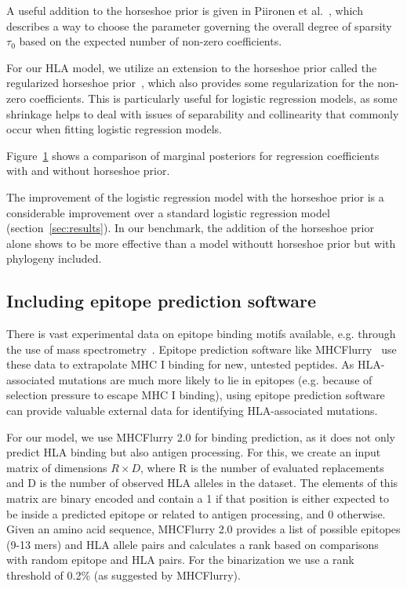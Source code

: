 \documentclass[fleqn,11pt]{SelfArx} %
\begin{document}
A useful addition to the horseshoe prior is given in Piironen et al.~\cite{Piironen2017}, which describes a way to choose the parameter governing the overall degree of sparsity \(\tau_{0}\) based on the expected number of non-zero coefficients. 

For our HLA model, we utilize an extension to the horseshoe prior called the regularized horseshoe prior~\cite{Piironen2017}, which also provides some regularization for the non-zero coefficients. This is particularly useful for logistic regression models, as some shrinkage helps to deal with issues of separability and collinearity that commonly occur when fitting logistic regression models.

Figure~\ref{fig:horseshoe-comparison} shows a comparison of marginal posteriors for regression coefficients with and without horseshoe prior.

The improvement of the logistic regression model with the horseshoe prior is a considerable improvement over a standard logistic regression model  (section~\ref{sec:results}). In our benchmark, the addition of the horseshoe prior alone shows to be more effective than a model withoutt horseshoe prior but with phylogeny included.

\begin{figure}
  \label{fig:horseshoe-comparison}
\end{figure}

\subsection*{Including epitope prediction software}

There is vast experimental data on epitope binding motifs available, e.g. through the use of mass spectrometry~\cite{Hunt1992}. Epitope prediction software like MHCFlurry~\cite{ODonnell2020} use these data to extrapolate MHC I binding for new, untested peptides.
As HLA-associated mutations are much more likely to lie in epitopes (e.g. because of selection pressure to escape MHC I binding), using epitope prediction software can provide valuable external data for identifying HLA-associated mutations.

For our model, we use MHCFlurry 2.0 for binding prediction, as it does not only predict HLA binding but also antigen processing. For this, we create an input matrix of dimensions \(R\times D\), where R is the number of evaluated replacements and D is the number of observed HLA alleles in the dataset. The elements of this matrix are binary encoded and contain a 1 if that position is either expected to be inside a predicted epitope or related to antigen processing, and 0 otherwise. Given an amino acid sequence, MHCFlurry 2.0 provides a list of possible epitopes (9-13 mers) and HLA allele pairs and calculates a rank based on comparisons with random epitope and HLA pairs. For the binarization we use a rank threshold of 0.2\% (as suggested by MHCFlurry).
\end{document}
